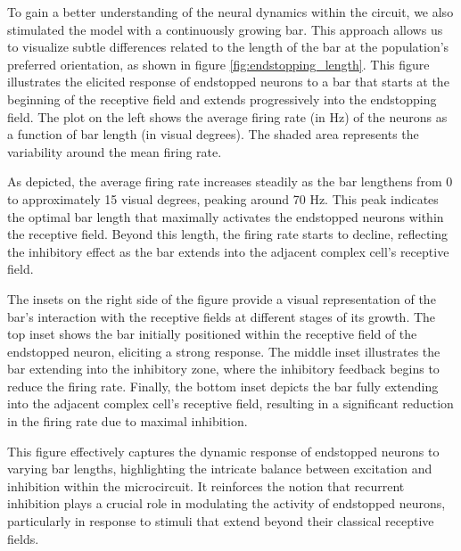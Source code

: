 \documentclass[12pt]{article}
\begin{document}
To gain a better understanding of the neural dynamics within the circuit, we also stimulated the model with a continuously growing bar. This approach allows us to visualize subtle differences related to the length of the bar at the population's preferred orientation, as shown in figure \ref{fig:endstopping_length}. This figure illustrates the elicited response of endstopped neurons to a bar that starts at the beginning of the receptive field and extends progressively into the endstopping field. The plot on the left shows the average firing rate (in Hz) of the neurons as a function of bar length (in visual degrees). The shaded area represents the variability around the mean firing rate.

As depicted, the average firing rate increases steadily as the bar lengthens from 0 to approximately 15 visual degrees, peaking around 70 Hz. This peak indicates the optimal bar length that maximally activates the endstopped neurons within the receptive field. Beyond this length, the firing rate starts to decline, reflecting the inhibitory effect as the bar extends into the adjacent complex cell's receptive field.

The insets on the right side of the figure provide a visual representation of the bar's interaction with the receptive fields at different stages of its growth. The top inset shows the bar initially positioned within the receptive field of the endstopped neuron, eliciting a strong response. The middle inset illustrates the bar extending into the inhibitory zone, where the inhibitory feedback begins to reduce the firing rate. Finally, the bottom inset depicts the bar fully extending into the adjacent complex cell's receptive field, resulting in a significant reduction in the firing rate due to maximal inhibition.

This figure effectively captures the dynamic response of endstopped neurons to varying bar lengths, highlighting the intricate balance between excitation and inhibition within the microcircuit. It reinforces the notion that recurrent inhibition plays a crucial role in modulating the activity of endstopped neurons, particularly in response to stimuli that extend beyond their classical receptive fields.
\end{document}
